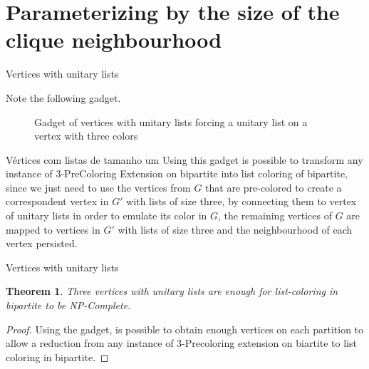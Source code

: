 \documentclass[9pt, compress]{beamer}
\newtheorem{teorema}{Theorem}
\newcommand{\?}{\textcolor{warn}{\textit{?}}}
\begin{document}
     \section{Parameterizing by the size of the clique neighbourhood}
     \begin{frame}{Vertices with unitary lists}
       
    Note the following gadget.
   \begin{figure}[H]
      \begin{subfigure}
        \centering
		    
      \end{subfigure}
      \begin{subfigure}
        \centering
		    
      \end{subfigure}
      \begin{subfigure}
        \centering
		    
      \end{subfigure}
      \caption{Gadget of vertices with unitary lists forcing a unitary list on a vertex with three colors}
      \label{fig:gadget}
  \end{figure}
    \end{frame}
    \begin{frame}{Vértices com listas de tamanho um}
      Using this gadget is possible to transform any instance of 3-PreColoring Extension on bipartite into list coloring of bipartite, since we just need to use the vertices from $G$ that are pre-colored to create a correspondent vertex in $G'$ with lists of size three, by connecting them to vertex of unitary lists in order to emulate its color in $G$, the remaining vertices of $G$ are mapped to vertices in $G'$ with lists of size three and the neighbourhood of each vertex persisted.
      
    \end{frame}
     \begin{frame}{Vertices with unitary lists}
       \begin{teorema}
         Three vertices with unitary lists are enough for list-coloring in bipartite to be NP-Complete.
       \end{teorema}
       \begin{proof}
        Using the gadget, is possible to obtain enough vertices on each partition to allow a reduction from any instance of 3-Precoloring extension on biartite to list coloring in bipartite.
       \end{proof}
     \end{frame}
\end{document}
